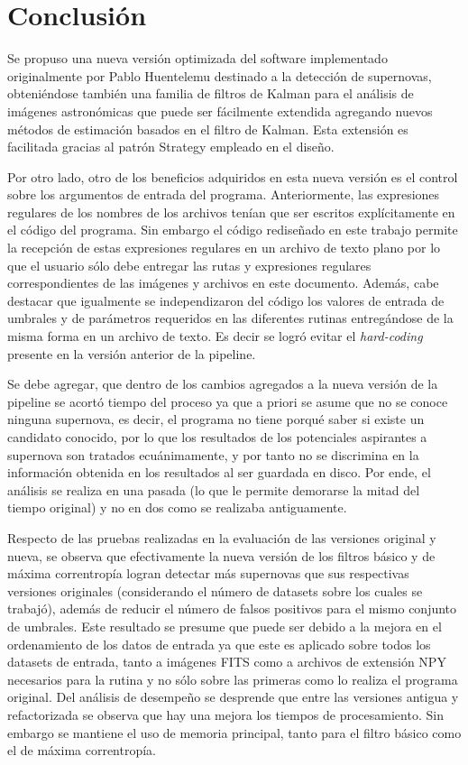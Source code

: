 \chapter{Conclusi\'on}
\label{ch:conclusion}

Se propuso una nueva versi\'on optimizada del software implementado originalmente por Pablo Huentelemu destinado a la detecci\'on de supernovas, obteni\'endose tambi\'en una familia de filtros de Kalman para el an\'alisis de im\'agenes astron\'omicas que puede ser f\'acilmente extendida agregando nuevos m\'etodos de estimaci\'on basados en el filtro de Kalman. Esta extensi\'on es facilitada gracias al patr\'on Strategy empleado en el dise\~no.
\bigskip

Por otro lado, otro de los beneficios adquiridos en esta nueva versi\'on es el control sobre los argumentos de entrada del programa. Anteriormente, las expresiones regulares de los nombres de los archivos ten\'ian que ser escritos expl\'icitamente en el c\'odigo del programa. Sin embargo el c\'odigo redise\~nado en este trabajo permite la recepci\'on de estas expresiones regulares en un archivo de texto plano por lo que el usuario s\'olo debe entregar las rutas y expresiones regulares correspondientes de las im\'agenes y archivos en este documento. Adem\'as, cabe destacar que igualmente se independizaron del c\'odigo los valores de entrada de umbrales y de par\'ametros requeridos en las diferentes rutinas entreg\'andose de la misma forma en un archivo de texto. Es decir se logr\'o evitar el \textit{hard-coding} presente en la versi\'on anterior de la pipeline.
\bigskip

Se debe agregar, que dentro de los cambios agregados a la nueva versi\'on de la pipeline se acort\'o tiempo del proceso ya que a priori se asume que no se conoce ninguna supernova, es decir, el programa no tiene porqu\'e saber si existe un candidato conocido, por lo que los resultados de los potenciales aspirantes a supernova son tratados ecu\'animamente, y por tanto no se discrimina en la informaci\'on obtenida en los resultados al ser guardada en disco. Por ende, el an\'alisis se realiza en una pasada (lo que le permite demorarse la mitad del tiempo original) y no en dos como se realizaba antiguamente.
\bigskip

Respecto de las pruebas realizadas en la evaluaci\'on de las versiones original y nueva, se observa que efectivamente la nueva versi\'on de los filtros b\'asico y de m\'axima correntrop\'ia logran detectar m\'as supernovas que sus respectivas versiones originales (considerando el n\'umero de datasets sobre los cuales se trabaj\'o), adem\'as de reducir el n\'umero de falsos positivos para el mismo conjunto de umbrales. Este resultado se presume que puede ser debido a la mejora en el ordenamiento de los datos de entrada ya que este es aplicado sobre todos los datasets de entrada, tanto a im\'agenes FITS como a archivos de extensi\'on NPY necesarios para la rutina y no s\'olo sobre las primeras como lo realiza el programa original. Del an\'alisis de desempe\~no se desprende que entre las versiones antigua y refactorizada se observa que hay una mejora los tiempos de procesamiento. Sin embargo se mantiene el uso de memoria principal, tanto para el filtro b\'asico como el de m\'axima correntrop\'ia. 
\bigskip

